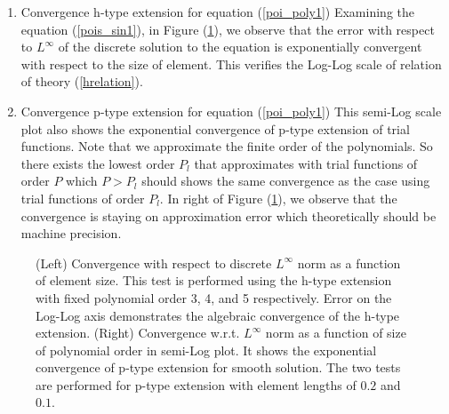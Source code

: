 \begin{enumerate}

\item {Convergence h-type extension for equation (\ref{poi_poly1})}
Examining the equation (\ref{pois_sin1}), in Figure
(\ref{ScrvconvDN1}), we observe that the error with respect to
$L^{\infty}$ of the discrete solution to the equation is
exponentially convergent with respect to the size of element. This
verifies the Log-Log scale of relation of theory
(\ref{hrelation}).
\item {Convergence p-type extension for equation (\ref{poi_poly1})}
This semi-Log scale plot also shows the exponential convergence of
p-type extension of trial functions. Note that we approximate the
finite order of the polynomials. So there exists the lowest order
$P_l$ that approximates with trial functions of order $P$ which $P
> P_l$ should shows the same convergence as the case using trial
functions of order $P_l$. In right of Figure (\ref{ScrvconvDN1}),
we observe that the convergence is staying on approximation error
which theoretically should be machine precision.
\end{enumerate}

\begin{figure}[h]
\begin{center}
\caption{\label{ScrvconvDN1}
(Left) Convergence with respect to discrete $L^{\infty}$ norm as a function of  element
size. This test is performed using the h-type extension with fixed
polynomial order 3, 4, and 5 respectively. Error on the Log-Log
axis demonstrates the algebraic convergence of the h-type
extension.
(Right) Convergence w.r.t. $L^{\infty}$ norm as a function of size
of polynomial order in semi-Log plot. It shows the exponential
convergence of p-type extension for smooth solution. The two tests
are performed for p-type extension with element lengths of $0.2$
and $0.1$. }
\end{center}
\end{figure}


